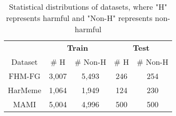

\begin{table}[t]
\centering
  \begin{tabular}{c|cc|cc}
    \hline
     & \multicolumn{2}{c|}{\textbf{Train}} & \multicolumn{2}{c}{\textbf{Test}}\\
    Dataset & \# H & \# Non-H & \# H & \# Non-H\\
    \hline\hline
    FHM-FG & 3,007 & 5,493 & 246 & 254 \\
    HarMeme & 1,064 & 1,949 & 124 & 230\\
    MAMI & 5,004 & 4,996 & 500 & 500 \\
    \hline
\end{tabular}
\caption{Statistical distributions of datasets, where "H" represents harmful and "Non-H" represents non-harmful }
  \label{tab:dataset}
\end{table} 

